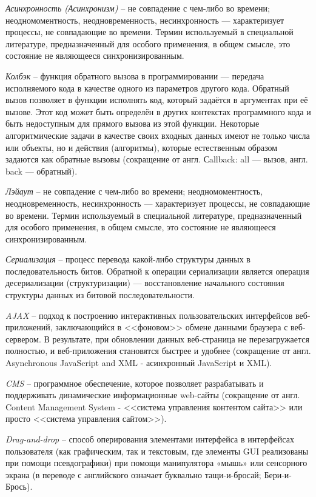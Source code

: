 \label{sec:definitions}

\emph{Асинхронность (Асинхронизм)} -- не совпадение с чем-либо во времени; неодномоментность, неодновременность, несинхронность — характеризует процессы, не совпадающие во времени. Термин используемый в специальной литературе, предназначенный для особого применения, в общем смысле, это состояние не являющееся синхронизированным.

\emph{Колбэк} -- функция обратного вызова в программировании — передача исполняемого кода в качестве одного из параметров другого кода. Обратный вызов позволяет в функции исполнять код, который задаётся в аргументах при её вызове. Этот код может быть определён в других контекстах программного кода и быть недоступным для прямого вызова из этой функции. Некоторые алгоритмические задачи в качестве своих входных данных имеют не только числа или объекты, но и действия (алгоритмы), которые естественным образом задаются как обратные вызовы (сокращение от англ. Сallback: all — вызов, англ. back — обратный).

\emph{Лэйаут} -- не совпадение с чем-либо во времени; неодномоментность, неодновременность, несинхронность — характеризует процессы, не совпадающие во времени. Термин используемый в специальной литературе, предназначенный для особого применения, в общем смысле, это состояние не являющееся синхронизированным.

\emph{Сериализация} -- процесс перевода какой-либо структуры данных в последовательность битов. Обратной к операции сериализации является операция десериализации (структуризации) — восстановление начального состояния структуры данных из битовой последовательности.

\emph{AJAX} -- подход к построению интерактивных пользовательских интерфейсов веб-приложений, заключающийся в <<фоновом>> обмене данными браузера с веб-сервером. В результате, при обновлении данных веб-страница не перезагружается полностью, и веб-приложения становятся быстрее и удобнее (сокращение от англ. Asynchronous JavaScript and XML - асинхронный JavaScript и XML).

\emph{CMS} -- программное обеспечение, которое позволяет разрабатывать и поддерживать динамические информационные web-сайты (сокращение от англ. Content Management System - <<система управления контентом сайта>> или просто <<система управления сайтом>>).

\emph{Drag-and-drop} -- способ оперирования элементами интерфейса в интерфейсах пользователя (как графическим, так и текстовым, где элементы GUI реализованы при помощи псевдографики) при помощи манипулятора «мышь» или сенсорного экрана (в переводе с английского означает буквально тащи-и-бросай; Бери-и-Брось).

